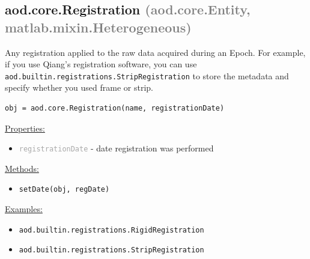 \documentclass[10pt]{exam}
\newcommand\myparent[1]{\textcolor{gray}{(#1)}}
\newcommand\aodclass[1]{\textcolor{codeblue}{\texttt{#1}}}
\newcommand\aodprop[1]{\textcolor{darkgray}{\texttt{#1}}}
\newcommand\aodfcn[1]{\textcolor{darkteal}{\texttt{#1}}}
\newcommand\docheader[1]{\vspace{0.6ex}\noindent\underline{#1}\vspace{0.15ex}}
\begin{document}
	\subsection{aod.core.Registration \myparent{aod.core.Entity, matlab.mixin.Heterogeneous}}
		\noindent Any registration applied to the raw data acquired during an Epoch. For example, if you use Qiang's registration software, you can use \aodclass{aod.builtin.registrations.StripRegistration} to store the metadata and specify whether you used frame or strip.  
		
		\begin{lstlisting}[style=matlab-editor, basicstyle=\mlttfamily\footnotesize]
obj = aod.core.Registration(name, registrationDate)
		\end{lstlisting}
		\docheader{Properties:}
		\begin{itemize}
			\item \aodprop{registrationDate} - date registration was performed
		\end{itemize}
		\docheader{Methods:}
		\begin{itemize}
			\item \aodfcn{setDate(obj, regDate)}
		\end{itemize}
		\docheader{Examples:}
		\begin{itemize}
			\item \aodclass{aod.builtin.registrations.RigidRegistration}
			\item \aodclass{aod.builtin.registrations.StripRegistration}
		\end{itemize}
\end{document}
